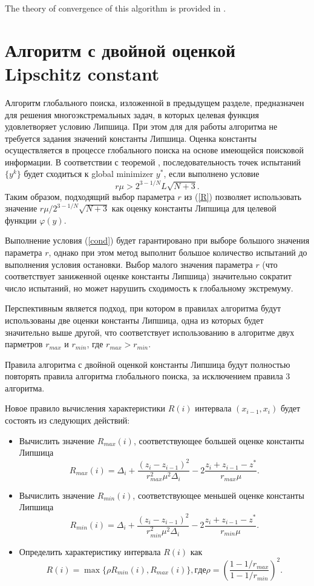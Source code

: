 \documentclass[runningheads]{llncs}
\begin{document}
The theory of convergence of this algorithm is provided in \cite{Strongin2000}.

\section{Алгоритм с двойной оценкой Lipschitz constant}

Алгоритм глобального поиска, изложенной в предыдущем разделе, предназначен для решения многоэкстремальных задач, в которых целевая функция удовлетворяет условию Липшица. При этом для для работы алгоритма не требуется задания  значений константы Липшица. Оценка константы осуществляется в процессе глобального поиска на основе имеющейся поисковой информации. 
В соответствии с теоремой \cite{Strongin2000}, последовательность точек испытаний $\{y^k\}$ будет сходиться к global minimizer $y^*$, если выполнено условие  
\begin{equation}\label{cond}
r\mu > 2^{3-1/N}L\sqrt{N+3}.
\end{equation}
Таким образом, подходящий выбор параметра $r$ из (\ref{R}) позволяет использовать значение $r\mu / 2^{3-1/N}\sqrt{N+3}$ как оценку константы Липшица для целевой функции $\varphi(y)$.


Выполнение условия (\ref{cond}) будет гарантировано при выборе большого значения параметра $r$, однако при этом метод выполнит большое количество испытаний до выполнения условия остановки.
Выбор малого значения параметра $r$ (что соответствует заниженной оценке константы Липшица) значительно сократит число испытаний, но может нарушить сходимость к глобальному экстремуму.

Перспективным является подход, при котором в правилах алгоритма будут использованы две оценки константы Липшица, одна из которых будет значительно выше другой, что соответствует использованию в алгоритме двух парметров $r_{max}$ и $r_{min}$, где $r_{max} > r_{min}$.

Правила алгоритма с двойной оценкой константы Липшица будут полностью повторять правила алгоритма глобального поиска, за исключением правила 3 алгоритма.

Новое правило вычисления характеристики $R(i)$ интервала $(x_{i-1}, x_i)$ будет состоять из следующих действий:
\begin{itemize}
\item
Вычислить значение $R_{max}(i)$, соответствующее большей оценке константы Липшица
\[
R_{max}(i)=\Delta_i+\frac{(z_i-z_{i-1})^2}{r_{max}^2\mu^2\Delta_i}-2\frac{z_i+z_{i-1}-z^*}{r_{max}\mu}.
\]
\item
Вычислить значение $R_{min}(i)$, соответствующее меньшей оценке константы Липшица
\[
R_{min}(i)=\Delta_i+\frac{(z_i-z_{i-1})^2}{r_{min}^2\mu^2\Delta_i}-2\frac{z_i+z_{i-1}-z^*}{r_{min}\mu}.
\]
\item
Определить характеристику интервала $R(i)$ как
\begin{equation}\label{pho}
R(i) = \max\{\rho R_{min}(i),R_{max}(i)\}, где \rho = \left(\frac{1-1/r_{max}}{1-1/r_{min}}\right)^2.
\end{equation}
\end{itemize}
\end{document}
